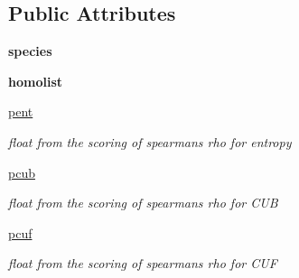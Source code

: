 \subsection*{Public Attributes}
\begin{DoxyCompactItemize}
\item 
\mbox{\label{class_py_c_u_b_1_1py_c_u_b_1_1_py_c_u_b_a60cc232d3d52f88fe8a80244b3fcddc8}} 
{\bfseries species}
\item 
\mbox{\label{class_py_c_u_b_1_1py_c_u_b_1_1_py_c_u_b_a91b69c31f346c4983b40c1525739cf16}} 
{\bfseries homolist}
\item 
\mbox{\label{class_py_c_u_b_1_1py_c_u_b_1_1_py_c_u_b_ab2fcbabe6d3870dbbaa0cfd11605b004}} 
\mbox{\hyperlink{class_py_c_u_b_1_1py_c_u_b_1_1_py_c_u_b_ab2fcbabe6d3870dbbaa0cfd11605b004}{pent}}
\begin{DoxyCompactList}\small\item\em float from the scoring of spearman\textquotesingle{}s rho for entropy \end{DoxyCompactList}\item 
\mbox{\label{class_py_c_u_b_1_1py_c_u_b_1_1_py_c_u_b_a9f1b34d59aff65055117cde8a174a474}} 
\mbox{\hyperlink{class_py_c_u_b_1_1py_c_u_b_1_1_py_c_u_b_a9f1b34d59aff65055117cde8a174a474}{pcub}}
\begin{DoxyCompactList}\small\item\em float from the scoring of spearman\textquotesingle{}s rho for C\+UB \end{DoxyCompactList}\item 
\mbox{\label{class_py_c_u_b_1_1py_c_u_b_1_1_py_c_u_b_a0081f01dedc28de7864a2424c6760546}} 
\mbox{\hyperlink{class_py_c_u_b_1_1py_c_u_b_1_1_py_c_u_b_a0081f01dedc28de7864a2424c6760546}{pcuf}}
\begin{DoxyCompactList}\small\item\em float from the scoring of spearman\textquotesingle{}s rho for C\+UF \end{DoxyCompactList}\end{DoxyCompactItemize}

